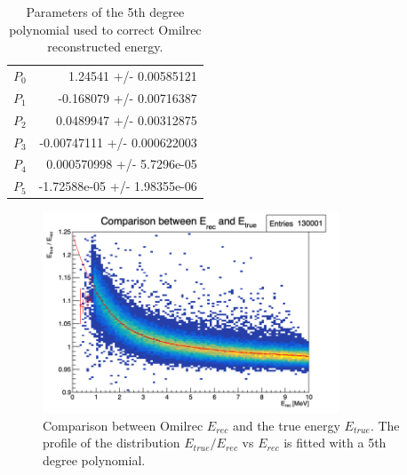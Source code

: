 \documentclass[../main.tex]{subfiles}
\begin{document}
\begin{table}[ht]
  \centering
  \begin{tabular}{|l|r|}
    $P_0$                        &      1.24541   +/-   0.00585121  \\
    $P_1$                        &    -0.168079   +/-   0.00716387  \\
    $P_2$                        &    0.0489947   +/-   0.00312875  \\
    $P_3$                        &  -0.00747111   +/-   0.000622003 \\
    $P_4$                        &  0.000570998   +/-   5.7296e-05  \\
    $P_5$                        & -1.72588e-05   +/-   1.98355e-06 \\
  \end{tabular}
  \caption{Parameters of the 5th degree polynomial used to correct Omilrec reconstructed energy.}
  \label{tab:jgnn:omil_params}
\end{table}

\begin{figure}[ht]
  \centering
  \includegraphics[height=6cm]{images/jgnn/e_rec_e_true_comp.png}
  \caption{Comparison between Omilrec $E_{rec}$ and the true energy $E_{true}$. The profile of the distribution $E_{true}/E_{rec}$ vs $E_{rec}$ is fitted with a 5th degree polynomial.}
  \label{fig:jgnn:e_rec_correction}
\end{figure}
\end{document}
